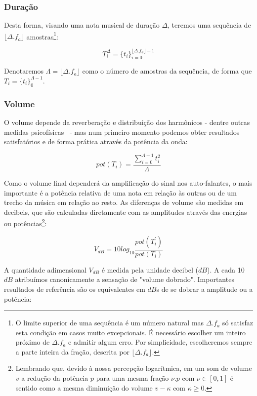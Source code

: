\subsubsection{Duração}
Desta forma, visando uma nota musical de duração $\Delta$,
teremos uma sequência de $ \lfloor \Delta . f_a \rfloor $ amostras\footnote{O
limite superior de uma sequência é um número natural mas $ \Delta . f_a $
só satisfaz esta condição em casos muito excepcionais. É necessário
escolher um inteiro próximo de $\Delta . f_a$ e admitir algum erro. Por simplicidade,
escolheremos sempre a parte inteira da fração, descrita por $\lfloor \Delta . f_a \rfloor$.}:

\begin{equation}
T_{i}^{\Delta}={\{t_i\}}_{i=0}^{\lfloor \Delta . f_a \rfloor -1}
\end{equation}

Denotaremos $\Lambda = \lfloor \Delta . f_a \rfloor$ como o número de amostras da sequência, de forma que $T_i=\{t_i\}_0^{\Lambda-1}$.

\subsubsection{Volume}
O volume depende da reverberação e distribuição dos harmônicos - dentre outras medidas psicofísicas~\cite{Chowning} - mas num primeiro momento podemos obter resultados satisfatórios e de forma prática através da potência da onda:

\begin{equation}\label{potencia}
pot(T_i)=\frac{\sum_{i=0}^{\Lambda -1} t_i^2}{\Lambda}
\end{equation} 

Como o volume final dependerá da amplificação do sinal nos auto-falantes, o mais importante é a potência relativa de uma nota em relação às outras ou de um trecho da música em relação ao resto. As diferenças de volume são medidas em decibels, que são
calculadas diretamente com as amplitudes através das energias ou potências\footnote{Lembrando que, devido à nossa percepção logarítmica,
em um som de volume $v$ a redução da potência $p$ para uma mesma fração $\nu . p $ 
com $\nu \in [0,1]$ é sentido como a mesma diminuição do volume $v-\kappa$ com $\kappa \geq 0$.}:

\begin{equation}\label{decibels}
V_{dB}=10log_{10}\frac{pot(T^{'}_i)}{pot(T_i)}
\end{equation}

A quantidade adimensional $V_{dB}$ é medida pela unidade decibel ($dB$). A cada 10 $dB$ atribuímos canonicamente
a sensação de "volume dobrado". Importantes resultados de referência são os equivalentes em $dB$s de se dobrar
a amplitude ou a potência:

